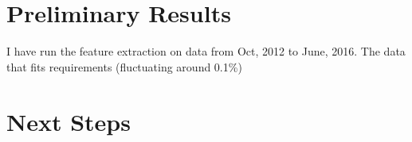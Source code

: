 \documentclass[a4paper]{article}
\begin{document}
\section{Preliminary Results}
I have run the feature extraction on data from Oct, 2012 to June, 2016. The data that fits requirements (fluctuating around 0.1\%) 
\section{Next Steps}
\end{document}

